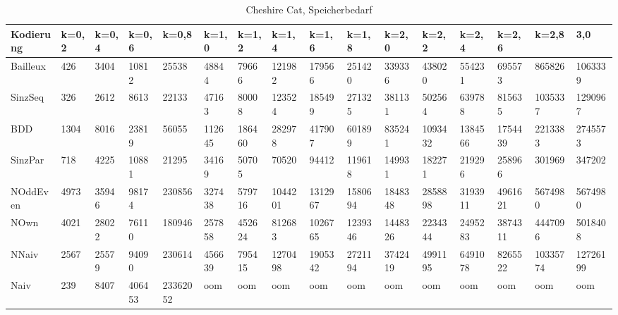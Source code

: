 \documentclass[a4,abstract=on]{scrartcl}
\begin{document}
\begin{landscape}
\begin{table}[h!]
   \end{table}
 \begin{table}[h!]
    \small
    \setlength{\tabcolsep}{0.11cm}
     \centering
     \begin{tabular}[width=\textwidth]{|l||l|l|l|l|l|l|l|l|l|l|l|l|l|l|l|}
	\hline
       \textbf{Kodierung}  & \textbf{k=0,2} & \textbf{k=0,4} & \textbf{k=0,6} &\textbf{k=0,8} &\textbf{k=1,0} &\textbf{k=1,2} &\textbf{k=1,4} &\textbf{k=1,6} &\textbf{k=1,8} &\textbf{k=2,0} &\textbf{k=2,2} &\textbf{k=2,4} &\textbf{k=2,6} &\textbf{k=2,8} & \textbf{3,0}\\
	\hline
	\hline
	Bailleux & 426 & 3404 & 10812 & 25538 & 48844 & 79666 & 121982 & 179566 & 251420 & 339336 & 438020 & 554231 & 695573 & 865826 & 1063339\\
\hline
	SinzSeq & 326 & 2612 & 8613 & 22133 & 47163 & 80008 & 123524 & 185499 & 271325 & 381131 & 502564 & 639788 & 815635 & 1035337 & 1290967 \\
\hline
	BDD & 1304 & 8016 & 23819 & 56055 & 112645 & 186460 & 282978 &417907 &601899 & 835241 & 1093432 & 1384566 & 1754439 & 2213383 & 2745573\\
\hline
	SinzPar & 718 & 4225 & 10881 & 21295 & 34169 & 50705 & 70520 & 94412 & 119618 & 149931 & 182271 & 219296 & 258966 & 301969  & 347202 \\
\hline
	NOddEven & 4973 & 35946 & 98174 & 230856 & 327438 & 579716 & 1044201 & 1312967 & 1580694 & 1848348& 2858898 & 3193911 & 4961621 & 5674980 & 5674980\\
\hline
	NOwn & 4021 & 28022 & 76110 & 180946 & 257858 & 452624 & 812683 & 1026765 & 1239346 & 1448326 & 2234344 & 2495283  & 3874311 & 4447096 & 5018408\\
 \hline
	NNaiv & 2567 & 25579 & 94090 & 230614 & 456639 & 795415 & 1270498 & 1905342 & 2721194 & 3742419 & 4991195 & 6491078 & 8265522 & 10335774 & 12726199\\
\hline
	Naiv & 239 & 8407 &  406453 &  23362052 &  oom &  oom &  oom &  oom &  oom &  oom &  oom &  oom &  oom &  oom & oom\\
\hline
       
     \end{tabular}

     \caption{Cheshire Cat, Speicherbedarf}
     \label{tbl:beispieltabelle}

   \end{table}


\end{landscape}
\end{document}
